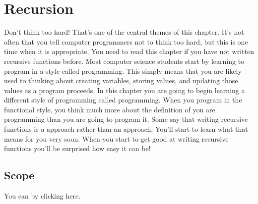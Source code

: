 \documentclass[letterpaper,10pt,english]{sphinxmanual}
\begin{document}
\chapter{Recursion}
\label{\detokenize{chap3/chap3:recursion}}\label{\detokenize{chap3/chap3::doc}}
Don’t think too hard! That’s one of the central themes of this chapter. It’s not often that you tell computer programmers not to think too hard, but this is one time when it is appropriate. You need to read this chapter if you have not written recursive functions before. Most computer science students start by learning to program in a style called  programming. This simply means that you are likely used to thinking about creating variables, storing values, and updating those values as a program proceeds. In this chapter you are going to begin learning a different style of programming called  programming. When you program in the functional style, you think much more about the definition of  you are programming than  you are going to program it. Some say that writing recursive functions is a  approach rather than an  approach. You’ll start to learn what that means for you very soon. When you start to get good at writing recursive functions you’ll be surprised how easy it can be!


\section{Scope}
\label{\detokenize{chap3/chap3:scope}}
You can  by clicking here.
\end{document}
